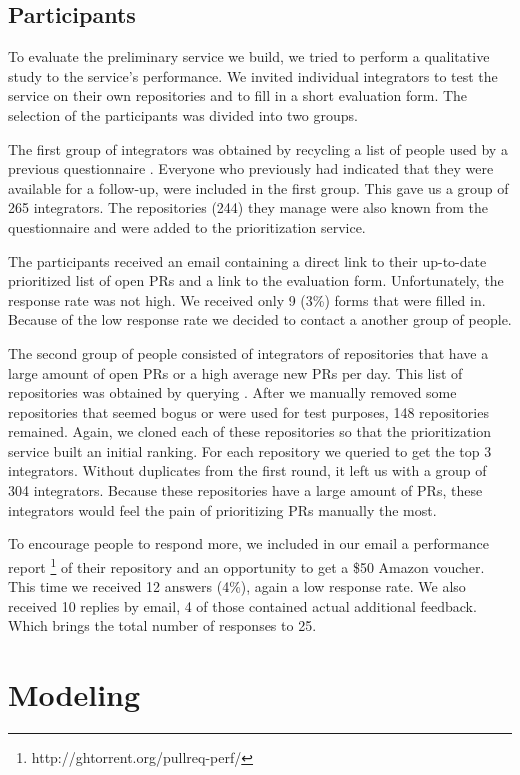 \documentclass[conference]{IEEEtran}
\begin{document}
\subsection{Participants}
To evaluate the preliminary service we build, we tried to perform a qualitative study to the service's performance.
We invited individual integrators to test the service on their own repositories and to fill in a short evaluation form.
The selection of the participants was divided into two groups.

The first group of integrators was obtained by recycling a list of people used by a previous questionnaire \cite{GZSD15}.
Everyone who previously had indicated that they were available for a follow-up, were included in the first group.
This gave us a group of 265 integrators.
The repositories (244) they manage were also known from the questionnaire and were added to the prioritization service.

The participants received an email containing a direct link to their up-to-date prioritized list of open PRs and a link to the evaluation form.
Unfortunately, the response rate was not high.
We received only 9 (3\%) forms that were filled in.
Because of the low response rate we decided to contact a another group of people.

The second group of people consisted of integrators of repositories that have a large amount of open PRs or a high average new PRs per day.
This list of repositories was obtained by querying \ghtorrent.
After we manually removed some repositories that seemed bogus or were used for test purposes, 148 repositories remained.
Again, we cloned each of these repositories so that the prioritization service built an initial ranking.
For each repository we queried \ghtorrent to get the top 3 integrators.
Without duplicates from the first round, it left us with a group of 304 integrators.
Because these repositories have a large amount of PRs, these integrators would feel the pain of prioritizing PRs manually the most.

To encourage people to respond more, we included in our email a performance report \footnote{http://ghtorrent.org/pullreq-perf/} of their repository and an opportunity to get a \$50 Amazon voucher.
This time we received 12 answers (4\%), again a low response rate.
We also received 10 replies by email, 4 of those contained actual additional feedback.
Which brings the total number of responses to 25.

\section{Modeling}
\label{sec:modeling}
\end{document}
